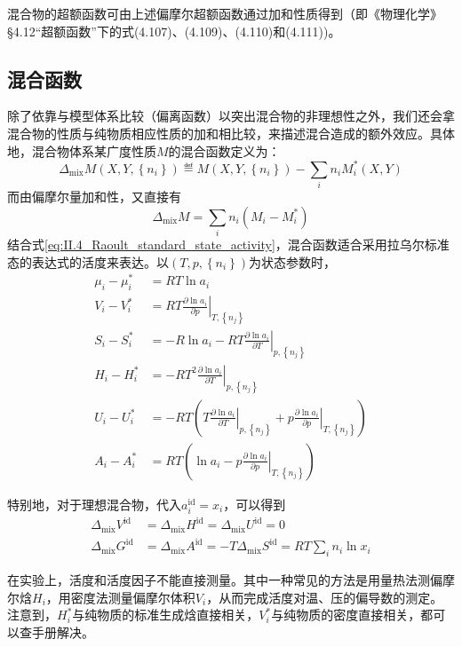 \documentclass[main.tex]{subfiles}
\begin{document}
混合物的超额函数可由上述偏摩尔超额函数通过加和性质得到（即《物理化学》\S4.12“超额函数”下的式(4.107)、(4.109)、(4.110)和(4.111))。

\subsection{混合函数}
除了依靠与模型体系比较（偏离函数）以突出混合物的非理想性之外，我们还会拿混合物的性质与纯物质相应性质的加和相比较，来描述混合造成的额外效应。具体地，混合物体系某广度性质$M$的混合函数定义为：
\[\Delta_\text{mix}M\left(X,Y,\left\{n_i\right\}\right)\eqdef M\left(X,Y,\left\{n_i\right\}\right)-\sum_in_iM_i^*\left(X,Y\right)\]
而由偏摩尔量加和性，又直接有
\[\Delta_\text{mix}M=\sum_in_i\left(M_i-M_i^*\right)\]
结合式\eqref{eq:II.4_Raoult_standard_state_activity}，混合函数适合采用拉乌尔标准态的表达式的活度来表达。以$\left(T,p,\left\{n_i\right\}\right)$为状态参数时，
\begin{align}
    \mu_i-\mu_i^* & =RT\ln a_i                                                                                                                                                       \\
    V_i-V_i^*     & =RT\left.\frac{\partial\ln a_i}{\partial p}\right|_{T,\left\{n_j\right\}}                                                                                        \\
    S_i-S_i^*     & =-R\ln a_i-RT\left.\frac{\partial\ln a_i}{\partial T}\right|_{p,\left\{n_j\right\}}                                                                              \\
    H_i-H_i^*     & =-RT^2\left.\frac{\partial\ln a_i}{\partial T}\right|_{p,\left\{n_j\right\}}                                                                                     \\
    U_i-U_i^*     & =-RT\left(T\left.\frac{\partial\ln a_i}{\partial T}\right|_{p,\left\{n_j\right\}}+p\left.\frac{\partial\ln a_i}{\partial p}\right|_{T,\left\{n_j\right\}}\right) \\
    A_i-A_i^*     & =RT\left(\ln a_i-p\left.\frac{\partial\ln a_i}{\partial p}\right|_{T,\left\{n_j\right\}}\right)
\end{align}

特别地，对于理想混合物，代入$a_i^\text{id}=x_i$，可以得到
\begin{align}
    \Delta_\text{mix}V^\text{id} & =\Delta_\text{mix}H^\text{id}=\Delta_\text{mix}U^\text{id}=0                    \\
    \Delta_\text{mix}G^\text{id} & =\Delta_\text{mix}A^\text{id}=-T\Delta_\text{mix}S^\text{id}=RT\sum_in_i\ln x_i
\end{align}

在实验上，活度和活度因子不能直接测量。其中一种常见的方法是用量热法测偏摩尔焓$H_i$\cite{Grolier2015}，用密度法测量偏摩尔体积$V_i$，从而完成活度对温、压的偏导数的测定。注意到，$H_i^*$与纯物质的标准生成焓直接相关，$V_i^*$与纯物质的密度直接相关，都可以查手册解决。
\end{document}
